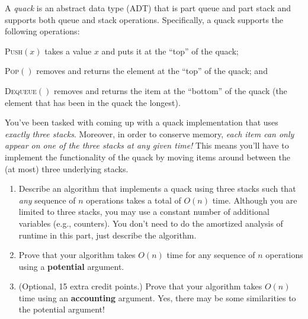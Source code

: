\documentclass[12 pt, letterpaper]{hmcpset}
\begin{document}
\begin{problem}
A \emph{quack} is an abstract data type (ADT) that is part queue and part stack and supports both queue and stack operations. Specifically, a quack supports the following operations:
    \begin{description}
	\item \textsc{Push}$(x)$ takes a value  $x$ and puts it at the ``top'' of the quack;
	\item \textsc{Pop}$()$ removes and returns the element at the ``top'' of the quack; and
	\item \textsc{Dequeue}$()$ removes and returns the item at the
		``bottom'' of the quack (the element that has been in the quack the longest).
    \end{description}
	You've been tasked with coming up with a quack implementation that uses  \emph{exactly three stacks}. Moreover, in order to conserve memory, \emph{each item can only appear on one of the three stacks at any given time!} This means you'll have to implement the functionality of the quack by moving items around between the (at most) three underlying stacks.
	\begin{enumerate}
		\item Describe an algorithm that implements a quack using three stacks
		such that \emph{any} sequence of $n$ operations takes a total of $O(n)$
		time.   Although you are limited to three stacks, you may use  a
		constant number of additional variables (e.g., counters).  You don't
		need to do the amortized analysis of runtime in this part, just describe the
		algorithm.
		\item Prove that your algorithm takes $O(n)$ time for any sequence of
        $n$ operations using a \textbf{potential} argument.
        \item (Optional, 15 extra credit points.) Prove that your algorithm takes $O(n)$ time using an \textbf{accounting} argument. Yes, there may be some similarities to the potential argument!
	\end{enumerate}
\end{problem}
\end{document}
